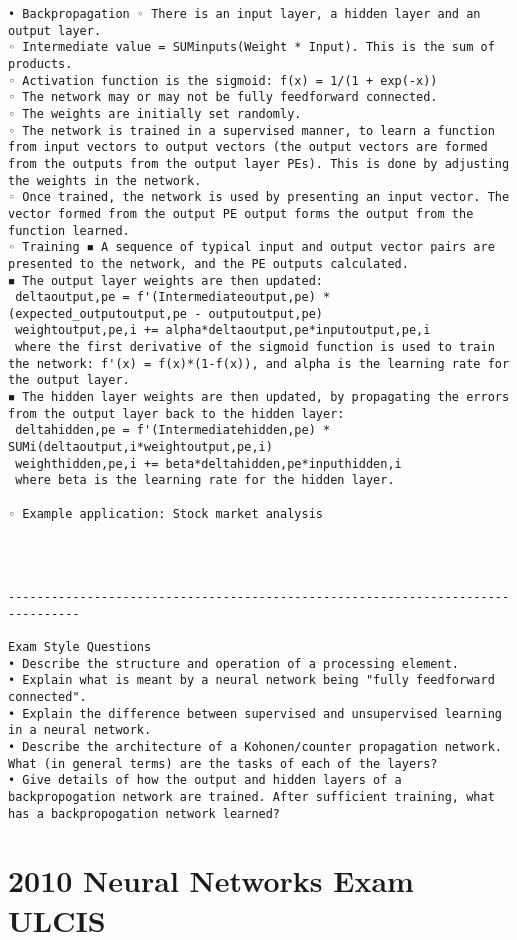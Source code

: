 \documentclass[a4paper,11pt]{report}
\begin{document}
\begin{verbatim}
• Backpropagation ◦ There is an input layer, a hidden layer and an output layer. 
◦ Intermediate value = SUMinputs(Weight * Input). This is the sum of products. 
◦ Activation function is the sigmoid: f(x) = 1/(1 + exp(-x)) 
◦ The network may or may not be fully feedforward connected. 
◦ The weights are initially set randomly. 
◦ The network is trained in a supervised manner, to learn a function from input vectors to output vectors (the output vectors are formed from the outputs from the output layer PEs). This is done by adjusting the weights in the network. 
◦ Once trained, the network is used by presenting an input vector. The vector formed from the output PE output forms the output from the function learned. 
◦ Training ◾ A sequence of typical input and output vector pairs are presented to the network, and the PE outputs calculated. 
◾ The output layer weights are then updated:
 deltaoutput,pe = f'(Intermediateoutput,pe) * (expected_outputoutput,pe - outputoutput,pe)
 weightoutput,pe,i += alpha*deltaoutput,pe*inputoutput,pe,i
 where the first derivative of the sigmoid function is used to train the network: f'(x) = f(x)*(1-f(x)), and alpha is the learning rate for the output layer. 
◾ The hidden layer weights are then updated, by propagating the errors from the output layer back to the hidden layer:
 deltahidden,pe = f'(Intermediatehidden,pe) * SUMi(deltaoutput,i*weightoutput,pe,i)
 weighthidden,pe,i += beta*deltahidden,pe*inputhidden,i
 where beta is the learning rate for the hidden layer. 

◦ Example application: Stock market analysis 




--------------------------------------------------------------------------------
 
Exam Style Questions
• Describe the structure and operation of a processing element. 
• Explain what is meant by a neural network being "fully feedforward connected". 
• Explain the difference between supervised and unsupervised learning in a neural network. 
• Describe the architecture of a Kohonen/counter propagation network. What (in general terms) are the tasks of each of the layers? 
• Give details of how the output and hidden layers of a backpropogation network are trained. After sufficient training, what has a backpropogation network learned? 

\end{verbatim}

\section{2010 Neural Networks Exam ULCIS}
\end{document}
